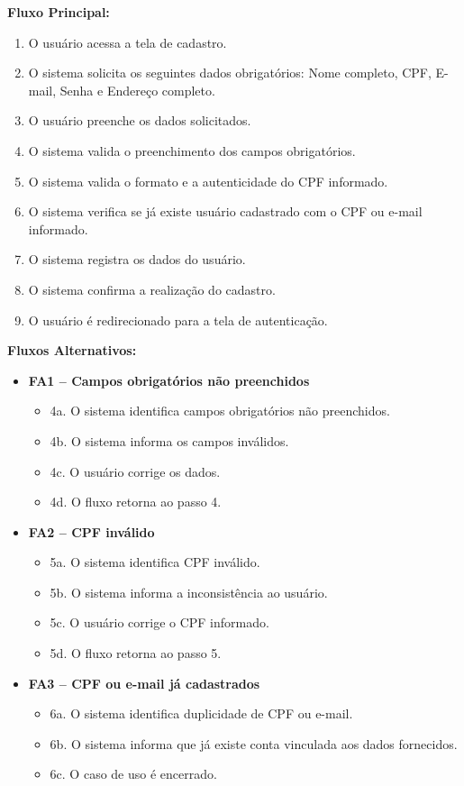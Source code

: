 \documentclass[
	article,			%
	11pt,				%
	oneside,			%
	a4paper,			%
	english,			%
	brazil,				%
	sumario=tradicional
	]{abntex2}
\begin{document}
\vspace{0.5em}
\noindent\textbf{Fluxo Principal:}
\begin{enumerate}[label=\arabic*.]
    \item O usuário acessa a tela de cadastro.
    \item O sistema solicita os seguintes dados obrigatórios: Nome completo, CPF, E-mail, Senha e Endereço completo.
    \item O usuário preenche os dados solicitados.
    \item O sistema valida o preenchimento dos campos obrigatórios.
    \item O sistema valida o formato e a autenticidade do CPF informado.
    \item O sistema verifica se já existe usuário cadastrado com o CPF ou e-mail informado.
    \item O sistema registra os dados do usuário.
    \item O sistema confirma a realização do cadastro.
    \item O usuário é redirecionado para a tela de autenticação.
\end{enumerate}

\vspace{0.5em}
\noindent\textbf{Fluxos Alternativos:}
\begin{itemize}[leftmargin=*]
    \item \textbf{FA1 – Campos obrigatórios não preenchidos}
    \begin{itemize}[label={}, leftmargin=0.5cm]
        \item 4a. O sistema identifica campos obrigatórios não preenchidos.
        \item 4b. O sistema informa os campos inválidos.
        \item 4c. O usuário corrige os dados.
        \item 4d. O fluxo retorna ao passo 4.
    \end{itemize}
    
    \item \textbf{FA2 – CPF inválido}
    \begin{itemize}[label={}, leftmargin=0.5cm]
        \item 5a. O sistema identifica CPF inválido.
        \item 5b. O sistema informa a inconsistência ao usuário.
        \item 5c. O usuário corrige o CPF informado.
        \item 5d. O fluxo retorna ao passo 5.
    \end{itemize}

    \item \textbf{FA3 – CPF ou e-mail já cadastrados}
    \begin{itemize}[label={}, leftmargin=0.5cm]
        \item 6a. O sistema identifica duplicidade de CPF ou e-mail.
        \item 6b. O sistema informa que já existe conta vinculada aos dados fornecidos.
        \item 6c. O caso de uso é encerrado.
    \end{itemize}
\end{itemize}
\end{document}
